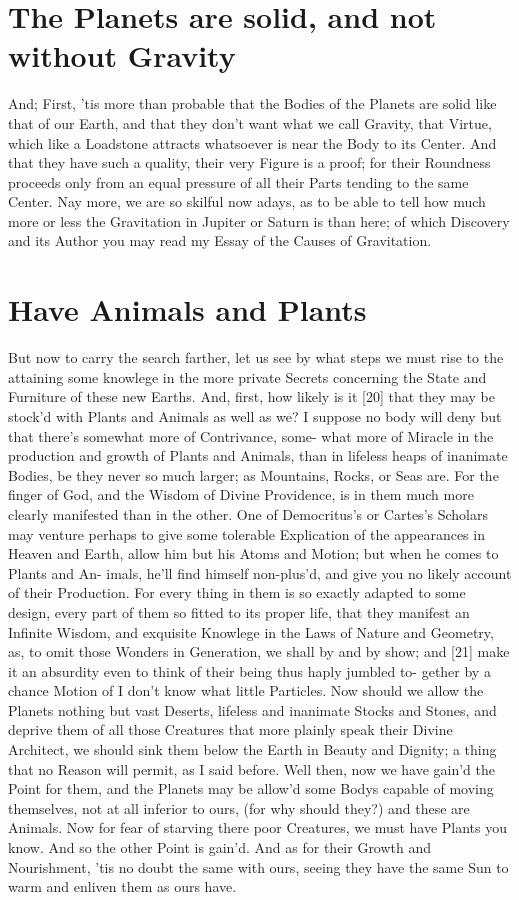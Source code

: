 \documentclass[letterpaper]{book}
\begin{document}
\section{The Planets are solid, and not without Gravity}

And; First, 'tis more than probable that the Bodies of the Planets are solid
like that of our Earth, and that they don't want what we call Gravity, that
Virtue, which like a Loadstone attracts whatsoever is near the Body to its
Center. And that they have such a quality, their very Figure is a proof; for
their Roundness proceeds only from an equal pressure of all their Parts
tending to the same Center. Nay more, we are so skilful now adays, as to be
able to tell how much more or less the Gravitation in Jupiter or Saturn is
than here; of which Discovery and its Author you may read my Essay of the
Causes of Gravitation.


\section{Have Animals and Plants}

But now to carry the search farther, let us see by what steps we must rise
to the attaining some knowlege in the more private Secrets concerning the
State and Furniture of these new Earths. And, first, how likely is it [20]
that they may be stock'd with Plants and Animals as well as we? I suppose no
body will deny but that there's somewhat more of Contrivance, some- what
more of Miracle in the production and growth of Plants and Animals, than in
lifeless heaps of inanimate Bodies, be they never so much larger; as
Mountains, Rocks, or Seas are. For the finger of God, and the Wisdom of
Divine Providence, is in them much more clearly manifested than in the
other. One of Democritus's or Cartes's Scholars may venture perhaps to give
some tolerable Explication of the appearances in Heaven and Earth, allow him
but his Atoms and Motion; but when he comes to Plants and An- imals, he'll
find himself non-plus'd, and give you no likely account of their Production.
For every thing in them is so exactly adapted to some design, every part of
them so fitted to its proper life, that they manifest an Infinite Wisdom,
and exquisite Knowlege in the Laws of Nature and Geometry, as, to omit those
Wonders in Generation, we shall by and by show; and [21] make it an
absurdity even to think of their being thus haply jumbled to- gether by a
chance Motion of I don't know what little Particles. Now should we allow the
Planets nothing but vast Deserts, lifeless and inanimate Stocks and Stones,
and deprive them of all those Creatures that more plainly speak their Divine
Architect, we should sink them below the Earth in Beauty and Dignity; a
thing that no Reason will permit, as I said before.  Well then, now we have
gain'd the Point for them, and the Planets may be allow'd some Bodys capable
of moving themselves, not at all inferior to ours, (for why should they?)
and these are Animals. Now for fear of starving there poor Creatures, we
must have Plants you know. And so the other Point is gain'd. And as for
their Growth and Nourishment, 'tis no doubt the same with ours, seeing they
have the same Sun to warm and enliven them as ours have.
\end{document}
